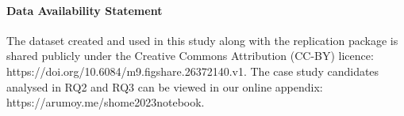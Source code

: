 \documentclass[smallextended]{svjour3}       %
\begin{document}
\paragraph{\textbf{Data Availability Statement}} The dataset created and used in this study along with the replication package is shared publicly under the Creative Commons Attribution (CC-BY) licence: https://doi.org/10.6084/m9.figshare.26372140.v1. The case study candidates analysed in RQ2 and RQ3 can be viewed in our online appendix: https://arumoy.me/shome2023notebook.

\end{document}
